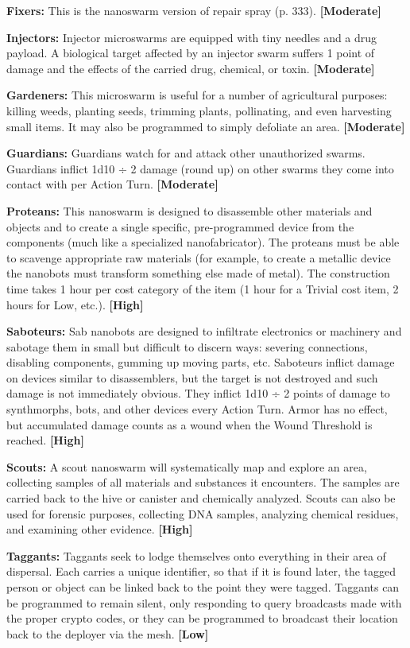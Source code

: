 \textbf{Fixers:} This is the nanoswarm version of repair 
spray (p. 333). \textbf{[Moderate]}

\textbf{Injectors:} Injector microswarms are equipped with 
tiny needles and a drug payload. A biological target 
affected by an injector swarm suffers 1 point of 
damage and the effects of the carried drug, chemical, 
or toxin. \textbf{[Moderate]}

\textbf{Gardeners:} This microswarm is useful for a number 
of agricultural purposes: killing weeds, planting seeds, 
trimming plants, pollinating, and even harvesting 
small items. It may also be programmed to simply 
defoliate an area. \textbf{[Moderate]}

\textbf{Guardians:} Guardians watch for and attack other 
unauthorized swarms. Guardians inflict 1d10 ÷ 2 
damage (round up) on other swarms they come into 
contact with per Action Turn. \textbf{[Moderate]}

\textbf{Proteans:} This nanoswarm is designed to disassemble 
other materials and objects and to create a single specific, 
pre-programmed device from the components (much 
like a specialized nanofabricator). The proteans must be 
able to scavenge appropriate raw materials (for example, 
to create a metallic device the nanobots must transform 
something else made of metal). The construction time 
takes 1 hour per cost category of the item (1 hour for a 
Trivial cost item, 2 hours for Low, etc.). \textbf{[High]}

\textbf{Saboteurs:} Sab nanobots are designed to infiltrate 
electronics or machinery and sabotage them in small 
but difficult to discern ways: severing connections, 
disabling components, gumming up moving parts, 
etc. Saboteurs inflict damage on devices similar to 
disassemblers, but the target is not destroyed and 
such damage is not immediately obvious. They inflict 
1d10 ÷ 2 points of damage to synthmorphs, bots, and 
other devices every Action Turn. Armor has no effect, 
but accumulated damage counts as a wound when the 
Wound Threshold is reached. \textbf{[High]}

\textbf{Scouts:} A scout nanoswarm will systematically
map and explore an area, collecting samples
of all materials and substances it encounters. The 
samples are carried back to the hive or canister 
and chemically analyzed. Scouts can also be used 
for forensic purposes, collecting DNA samples, 
analyzing chemical residues, and examining other 
evidence. \textbf{[High]}

\textbf{Taggants:} Taggants seek to lodge themselves onto 
everything in their area of dispersal. Each carries 
a unique identifier, so that if it is found later, the 
tagged person or object can be linked back to 
the point they were tagged. Taggants can be programmed
to remain silent, only responding to query
broadcasts made with the proper crypto codes, or 
they can be programmed to broadcast their location 
back to the deployer via the mesh. \textbf{[Low]}

